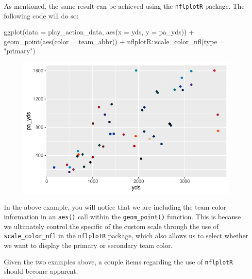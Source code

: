 \documentclass[
  letterpaper,
]{krantz}
\newenvironment{Shaded}{\begin{snugshade}}{\end{snugshade}}
\newcommand{\AttributeTok}[1]{\textcolor[rgb]{0.40,0.45,0.13}{#1}}
\newcommand{\FunctionTok}[1]{\textcolor[rgb]{0.28,0.35,0.67}{#1}}
\newcommand{\NormalTok}[1]{\textcolor[rgb]{0.00,0.23,0.31}{#1}}
\newcommand{\SpecialCharTok}[1]{\textcolor[rgb]{0.37,0.37,0.37}{#1}}
\newcommand{\StringTok}[1]{\textcolor[rgb]{0.13,0.47,0.30}{#1}}
\begin{document}
As mentioned, the same result can be achieved using the
\texttt{nflplotR} package. The following code will do so:

\begin{Shaded}
\begin{Highlighting}[]
\FunctionTok{ggplot}\NormalTok{(}\AttributeTok{data =}\NormalTok{ play\_action\_data, }\FunctionTok{aes}\NormalTok{(}\AttributeTok{x =}\NormalTok{ yds, }\AttributeTok{y =}\NormalTok{ pa\_yds)) }\SpecialCharTok{+}
  \FunctionTok{geom\_point}\NormalTok{(}\FunctionTok{aes}\NormalTok{(}\AttributeTok{color =}\NormalTok{ team\_abbr)) }\SpecialCharTok{+}
\NormalTok{  nflplotR}\SpecialCharTok{::}\FunctionTok{scale\_color\_nfl}\NormalTok{(}\AttributeTok{type =} \StringTok{"primary"}\NormalTok{)}
\end{Highlighting}
\end{Shaded}

\begin{figure}[H]

{\centering \includegraphics{04-nfl-analytics-visualization_files/figure-pdf/adding-color-with-nflplotr-1.pdf}

}

\end{figure}

In the above example, you will notice that we are including the team
color information in an \texttt{aes()} call within the
\texttt{geom\_point()} function. This is because we ultimately control
the specific of the custom scale through the use of
\texttt{scale\_color\_nfl} in the \texttt{nflplotR} package, which also
allows us to select whether we want to display the primary or secondary
team color.

Given the two examples above, a couple items regarding the use of
\texttt{nflplotR} should become apparent.
\end{document}
